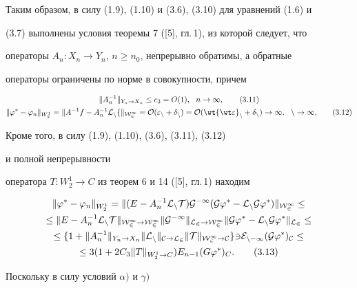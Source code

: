 Таким образом, в силу (1.9), (1.10) и (3.6), (3.10) для уравнений (1.6) и


(3.7) выполнены условия теоремы 7 ([5], гл.\,1), из которой следует, что


операторы $A_n: X_n\to Y_n$, $n\ge n_0$, непрерывно обратимы, а обратные 


операторы ограничены по норме в совокупности, причем


\begin{gather}


\|A^{-1}_n\|_{Y_n\to X_n}\le c_3=O(1),\ \  n\to\infty,


\tag{3.11} \\


%


\|\vp^{*}-\vp_n\|_{W^1_2}=\|A^{-1}f-A^{-1}_n\rL_nf\|_{W^1_2}=O(\ve_n+


\delta_n)=


O(\wt{\wt\ve}_n+\delta_n)\to\infty,\ \ n\to\infty.


\tag{3.12}


\end{gather}


Кроме того, в силу (1.9), (1.10), (3.6), (3.11), (3.12) 


и полной непрерывности


оператора $T:W^1_2\to C$ из теорем 6 и 14 ([5], гл.\,1) находим


\begin{multline}


\|\vp^{*}-\vp_n\|_{W^1_2}=\|(E-A^{-1}_n\rL_nT)G^{-1}(G\vp^{*}-\rL


_nG\vp^{*})\|_{W^1_2}\le \\


%


\le\|E-A^{-1}_n\rL_nT\|_{W^1_2\to W^1_2}\|G^{-1}\|_{L_2\to W^1_2}


\|G\vp^{*}-\rL_nG\vp^{*}\|_{L_2}\le \\


%


\le\{1+\|A^{-1}_n\|_{Y_n\to X_n}\|\rL_n\|_{C\to L_2}\|T\|_


{W^1_2\to C}\} 3E_{n-1}(G\vp^{*})_C\le \\


%


\le 3(1+2C_3\|T\|_{W^1_2\to C})E_{n-1}(G\vp^{*})_C.


\tag{3.13}


\end{multline}


Поскольку в силу условий $\alpha)$ и $\gamma)$


